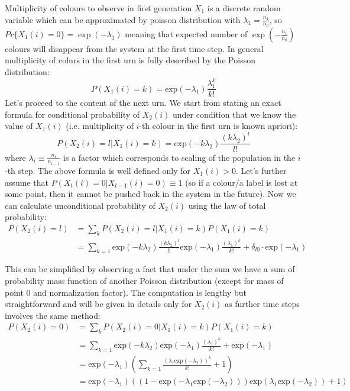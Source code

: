 Multiplicity of colours to observe in first generation $X_1$ is a discrete random variable which can be approximated by poisson distribution with $\lambda_1=\frac{n_1}{n_0}$, so $Pr\{X_1(i)=0\}=\exp(-\lambda_1)$ meaning that expected number of $\exp(-\frac{n_1}{n_0})$ colours will disappear from the system at the first time step.
In general multiplicity of colurs in the first urn is fully described by the Poisson distribution:
\begin{equation}
P(X_1(i)=k)=\mbox{exp}(-\lambda_1)\frac{\lambda_1^k}{k!}
\end{equation}
Let’s proceed to the content of the next urn. We start from stating an exact formula for conditional probability of $X_2(i)$ under condition that we know the value of $X_1(i)$ (i.e. multiplicity of $i$-th colour in the first urn is known apriori):
\begin{equation}
P\left(X_2(i)=l|X_1(i)=k\right)=\mbox{exp}\left(-k\lambda_2\right)\frac{\left(k\lambda_2\right)^l}{l!}
\end{equation}
where $\lambda_i\equiv\frac{n_i}{n_{i-1}}$ is a factor which corresponds to scaling of the population in the $i$-th step. The above formula is well defined only for $X_1(i)>0$. Let’s further assume that $P(X_t(i)=0|X_{t-1}(i)=0)\equiv1$ (so if a colour/a label is lost at some point, then it cannot be pushed back in the system in the future). Now we can calculate unconditional probability of $X_2(i)$ using the law of total probability:
\begin{equation*}
\begin{split}
P\left(X_2(i)=l\right) & =\sum_{k}P\left(X_2(i)=l|X_1(i)=k\right)P\left(X_1(i)=k\right) \\ & =\sum_{k=1}\mbox{exp}\left(-k\lambda_2\right)\frac{\left(k\lambda_2\right)^l}{l!}\mbox{exp}\left(-\lambda_1\right)\frac{\left(\lambda_1\right)^k}{k!} + \delta_{l0}\cdot\mbox{exp}\left(-\lambda_1\right)
\end{split}
\end{equation*}

This can be simplified by observing a fact that under the sum we have a sum of probability mass function of another Poisson distribution (except for mass of point $0$ and normalization factor). The computation is lengthy but straightforward and will be given in details only for $X_2(i)$ as further time steps involves the same method:
\begin{equation*}
\begin{split}
P\left(X_2(i)=0\right) & =\sum_{k}P\left(X_2(i)=0|X_1(i)=k\right)P\left(X_1(i)=k\right) \\ & =\sum_{k=1}\mbox{exp}\left(-k\lambda_2\right)\mbox{exp}\left(-\lambda_1\right)\frac{\left(\lambda_1\right)^k}{k!} + \mbox{exp}\left(-\lambda_1\right) \\ &
=\mbox{exp}\left(-\lambda_1\right)\left(\sum_{k=1}\frac{\left(\lambda_1\mbox{exp}\left(-\lambda_2\right)\right)^k}{k!} + 1 \right) \\ &
=\mbox{exp}\left(-\lambda_1\right)\left(\left(1-\mbox{exp}
\left(-\lambda_1\mbox{exp}\left(-\lambda_2\right)\right)\right)\mbox{exp}\left(\lambda_1
\mbox{exp}\left(-\lambda_2\right)\right)+1\right)
\end{split}
\end{equation*}

